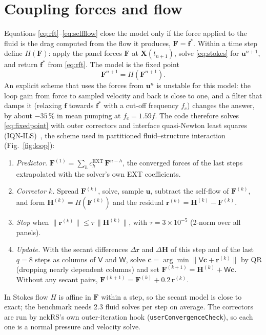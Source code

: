 \documentclass[10pt,a4paper]{article}
\newcommand{\vect}[1]{\bm{#1}}
\newcommand{\tens}[1]{\mathsf{#1}}
\newcommand{\code}[1]{\texttt{#1}}
\begin{document}
\section{Coupling forces and flow}

Equations \eqref{eq:rft}--\eqref{eq:selfflow} close the model only if the force applied to the fluid is the drag computed from the flow it produces, $\vect F = \vect f^*$.
Within a time step define $H(\vect F)$: apply the panel forces $\vect F$ at $\vect X(t_{n+1})$, solve \eqref{eq:stokes} for $\vect u^{n+1}$, and return $\vect f^*$ from \eqref{eq:rft}.
The model is the fixed point
\begin{equation}
  \vect F^{n+1} = H(\vect F^{n+1}).
  \label{eq:fixedpoint}
\end{equation}
An explicit scheme that uses the forces from $\vect u^n$ is unstable for this model: the loop gain from force to sampled velocity and back is close to one, and a filter that damps it (relaxing $\vect f$ towards $\vect f^*$ with a cut-off frequency $f_c$) changes the answer, by about $-35\,\%$ in mean pumping at $f_c = 1.59f$.
The code therefore solves \eqref{eq:fixedpoint} with outer correctors and interface quasi-Newton least squares (IQN-ILS)~\cite{Degroote2009}, the scheme used in partitioned fluid--structure interaction (Fig.~\ref{fig:loop}):
\begin{enumerate}
  \item \emph{Predictor.} $\vect F^{(1)} = \sum_h c^\mathrm{EXT}_h\,\vect F^{n-h}$, the converged forces of the last steps extrapolated with the solver's own EXT coefficients.
  \item \emph{Corrector $k$.} Spread $\vect F^{(k)}$, solve, sample $\vect u$, subtract the self-flow of $\vect F^{(k)}$, and form $\vect H^{(k)} = H(\vect F^{(k)})$ and the residual $\vect r^{(k)} = \vect H^{(k)} - \vect F^{(k)}$.
  \item \emph{Stop} when $\|\vect r^{(k)}\| \le \tau\,\|\vect H^{(k)}\|$, with $\tau = 3\times10^{-5}$ (2-norm over all panels).
  \item \emph{Update.} With the secant differences $\Delta\vect r$ and $\Delta\vect H$ of this step and of the last $q = 8$ steps as columns of $\tens V$ and $\tens W$, solve $\vect c = \arg\min\|\tens V\vect c + \vect r^{(k)}\|$ by QR (dropping nearly dependent columns) and set $\vect F^{(k+1)} = \vect H^{(k)} + \tens W\vect c$. Without any secant pairs, $\vect F^{(k+1)} = \vect F^{(k)} + 0.2\,\vect r^{(k)}$.
\end{enumerate}
In Stokes flow $H$ is affine in $\vect F$ within a step, so the secant model is close to exact; the benchmark needs 2.3 fluid solves per step on average.
The correctors are run by nekRS's own outer-iteration hook (\code{userConvergenceCheck}), so each one is a normal pressure and velocity solve.
\end{document}
